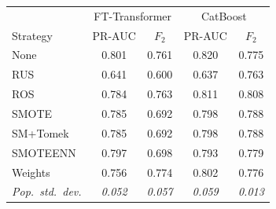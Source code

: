 \begin{tabular}{l cc cc}
\toprule
& \multicolumn{2}{c}{FT-Transformer} & \multicolumn{2}{c}{CatBoost} \\
Strategy & PR-AUC & $F_2$ & PR-AUC & $F_2$ \\
\midrule
None      & 0.801 & 0.761 & 0.820 & 0.775 \\
RUS       & 0.641 & 0.600 & 0.637 & 0.763 \\
ROS       & 0.784 & 0.763 & 0.811 & 0.808 \\
SMOTE     & 0.785 & 0.692 & 0.798 & 0.788 \\
SM+Tomek  & 0.785 & 0.692 & 0.798 & 0.788 \\
SMOTEENN  & 0.797 & 0.698 & 0.793 & 0.779 \\
Weights   & 0.756 & 0.774 & 0.802 & 0.776 \\
\midrule
\textit{Pop.\ std.\ dev.} & \textit{0.052} & \textit{0.057} & \textit{0.059} & \textit{0.013} \\
\bottomrule
\end{tabular}
